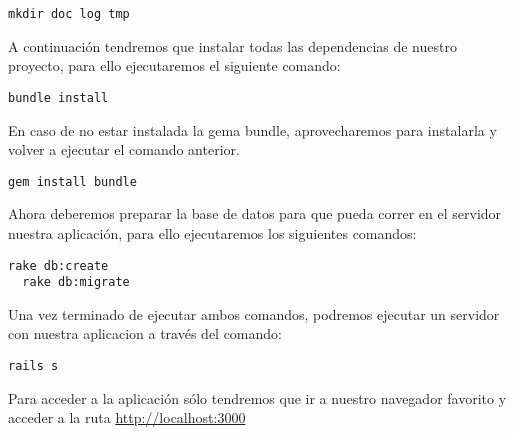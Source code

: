 \begin{lstlisting}[style=consola]
  mkdir doc log tmp
\end{lstlisting}

A continuación tendremos que instalar todas las dependencias de nuestro
proyecto, para ello ejecutaremos el siguiente comando:

\begin{lstlisting}[style=consola]
  bundle install
\end{lstlisting}

En caso de no estar instalada la gema bundle, aprovecharemos para instalarla y
volver a ejecutar el comando anterior.

\begin{lstlisting}[style=consola]
  gem install bundle
\end{lstlisting}

Ahora deberemos preparar la base de datos para que pueda correr en el servidor
nuestra aplicación, para ello ejecutaremos los siguientes comandos:

\begin{lstlisting}[style=consola]
  rake db:create 
  rake db:migrate
\end{lstlisting}

Una vez terminado de ejecutar ambos comandos, podremos ejecutar un servidor con
nuestra aplicacion a través del comando:

\begin{lstlisting}[style=consola]
  rails s
\end{lstlisting}

Para acceder a la aplicación sólo tendremos que ir a nuestro navegador favorito
y acceder a la ruta \url{http://localhost:3000}
